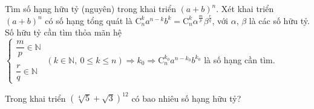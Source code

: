 \begin{dang}{Tìm số hạng hữu tỷ (nguyên) trong khai triển $(a+b)^n$.} %
    Xét khai triển $(a+b)^n$ có số hạng tổng quát là $\mathrm{C}^k_n a^{n-k} b^k = \mathrm{C}^k_n \alpha^{\frac{m}{p}} \beta^{\frac{r}{q}}$, với $\alpha$, $\beta$ là các số hữu tỷ. Số hữu tỷ cần tìm thỏa mãn hệ $\begin{cases}
    \dfrac{m}{p} \in \mathbb{N} \\ \\
    \dfrac{r}{q} \in \mathbb{N}
    \end{cases} \ (k \in \mathbb{N}, \ 0 \leq k \leq n) \Rightarrow k_0 \Rightarrow \mathrm{C}^{k_0}_n a^{n-k_0} b^{k_0}$ là số hạng cần tìm. 
\end{dang}
\begin{vd}%
    Trong khai triển $\left(\sqrt[4]{5} + \sqrt{3} \right)^{12}$ có bao nhiêu số hạng hữu tỷ? 
\end{vd}
